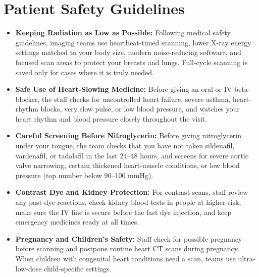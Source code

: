 \section{Patient Safety Guidelines}
\begin{itemize}
    \item \textbf{Keeping Radiation as Low as Possible:} Following medical safety guidelines, imaging teams use heartbeat-timed scanning, lower X-ray energy settings matched to your body size, modern noise-reducing software, and focused scan areas to protect your breasts and lungs. Full-cycle scanning is saved only for cases where it is truly needed.
    \item \textbf{Safe Use of Heart-Slowing Medicine:} Before giving an oral or IV beta-blocker, the staff checks for uncontrolled heart failure, severe asthma, heart-rhythm blocks, very slow pulse, or low blood pressure, and watches your heart rhythm and blood pressure closely throughout the visit.
    \item \textbf{Careful Screening Before Nitroglycerin:} Before giving nitroglycerin under your tongue, the team checks that you have not taken sildenafil, vardenafil, or tadalafil in the last 24--48 hours, and screens for severe aortic valve narrowing, certain thickened heart-muscle conditions, or low blood pressure (top number below 90--100 mmHg).
    \item \textbf{Contrast Dye and Kidney Protection:} For contrast scans, staff review any past dye reactions, check kidney blood tests in people at higher risk, make sure the IV line is secure before the fast dye injection, and keep emergency medicines ready at all times.
    \item \textbf{Pregnancy and Children's Safety:} Staff check for possible pregnancy before scanning and postpone routine heart CT scans during pregnancy. When children with congenital heart conditions need a scan, teams use ultra-low-dose child-specific settings.
\end{itemize}

